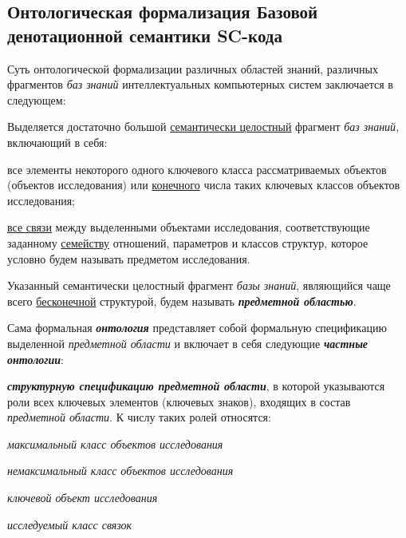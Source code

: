 \subsection{Онтологическая формализация Базовой денотационной семантики SC-кода}
\label{sec_ontological_formalization_basic_denotational_semantics_sc-code}

Суть онтологической формализации различных областей знаний, различных фрагментов \textit{баз знаний} интеллектуальных компьютерных систем заключается в следующем:
\begin{textitemize}
	\item Выделяется достаточно большой \underline{семантически целостный} фрагмент \textit{баз знаний}, включающий в себя:
	\begin{textitemize}
		\item все элементы некоторого одного ключевого класса рассматриваемых объектов (объектов исследования) или \underline{конечного} числа таких ключевых классов объектов исследования;
		\item \underline{все связи} между выделенными объектами исследования, соответствующие заданному \underline{семейству} отношений, параметров и классов структур, которое условно будем называть предметом исследования. 
	\end{textitemize}
	\item Указанный семантически целостный фрагмент \textit{базы знаний}, являющийся чаще всего \underline{бесконечной} структурой, будем называть \textbf{\textit{предметной областью}}.
	\item Сама формальная \textbf{\textit{онтология}} представляет собой формальную спецификацию выделенной \textit{предметной области} и включает в себя следующие \textbf{\textit{частные онтологии}}:
	\begin{textitemize}
		\item \textbf{\textit{структурную спецификацию предметной области}}, в которой указываются роли всех ключевых элементов (ключевых знаков), входящих в состав \textit{предметной области}. К числу таких ролей относятся:
		\begin{textitemize}
			\item \textit{максимальный класс объектов исследования\scnrolesign}
			\item \textit{немаксимальный класс объектов исследования\scnrolesign}
			\item \textit{ключевой объект исследования\scnrolesign}
			\item \textit{исследуемый класс связок\scnrolesign}

\end{textitemize}
\end{textitemize}
\end{textitemize}
